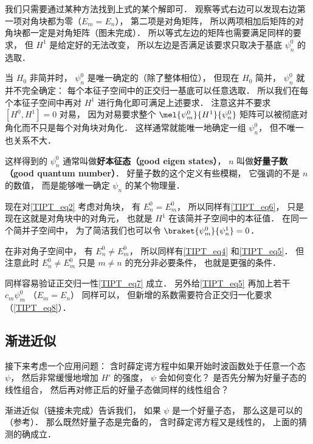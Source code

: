我们只需要通过某种方法找到上式的某个解即可． 观察等式右边可以发现右边第一项对角块都为零（$E_m = E_n$）， 第二项是对角矩阵， 所以两项相加后矩阵的对角块都一定是对角矩阵（图未完成）． 所以等式左边的矩阵也需要满足同样的要求， 但 $H^1$ 是给定好的无法改变， 所以左边是否满足该要求只取决于基底 $\psi_n^0$ 的选取．

当 $H_0$ 非简并时， $\psi_n^0$ 是唯一确定的（除了整体相位）， 但现在 $H_0$ 简并， $\psi_n^0$ 就并不完全确定： 每个本征子空间中的正交归一基底可以任意选取． 所以我们在每个本征子空间中再对 $H^1$ 进行角化即可满足上述要求． 注意这并不要求 $[H^0, H^1] = 0$ 对易， 因为对易要求整个 $\mel{\psi_m^0}{H^1}{\psi_n^0}$ 矩阵可以被彻底对角化而不只是每个对角块对角化． 这样通常就能唯一地确定一组 $\psi_n^0$， 但不唯一也关系不大．

这样得到的 $\psi_n^0$ 通常叫做\textbf{好本征态（good eigen states）}， $n$ 叫做\textbf{好量子数（good quantum number）}． 好量子数的这个定义有些模糊， 它强调的不是 $n$ 的数值， 而是能够唯一确定 $\psi_n$ 的某个物理量．

现在对\autoref{TIPT_eq2} 考虑对角块， 有 $E_n^0 = E_m^0$， 所以同样有\autoref{TIPT_eq6}， 只是现在这就是对角块中的对角元， 也就是 $H^1$ 在该简并子空间中的本征值． 在同一个简并子空间中， 为了简洁我们也可以令 $\braket{\psi_m^0}{\psi_n^1} = 0$．

在非对角子空间中， 有 $E_n^0 \ne E_m^0$， 所以同样有\autoref{TIPT_eq4} 和\autoref{TIPT_eq5}． 但注意此时 $E_n^0 \ne E_m^0$ 只是 $m \ne n$ 的充分非必要条件， 也就是更强的条件．

同样容易验证正交归一性\autoref{TIPT_eq7} 成立． 另外给\autoref{TIPT_eq5} 再加上若干 $c_m \psi_m^0$ （$E_m = E_n$） 同样可以， 但新增的系数需要符合正交归一化要求（\autoref{TIPT_eq8}）．

\subsection{渐进近似}
接下来考虑一个应用问题： 含时薛定谔方程中如果开始时波函数处于任意一个态 $\psi$， 然后非常缓慢地增加 $H'$ 的强度， $\psi$ 会如何变化？ 是否先分解为好量子态的线性组合， 然后再对修正后的好量子态做同样的线性组合？

渐进近似（链接未完成）告诉我们， 如果 $\psi$ 是一个好量子态， 那么这是可以的（参考\cite{GriffQ}）． 那么既然好量子态是完备的， 含时薛定谔方程又是线性的， 上面的猜测的确成立．
